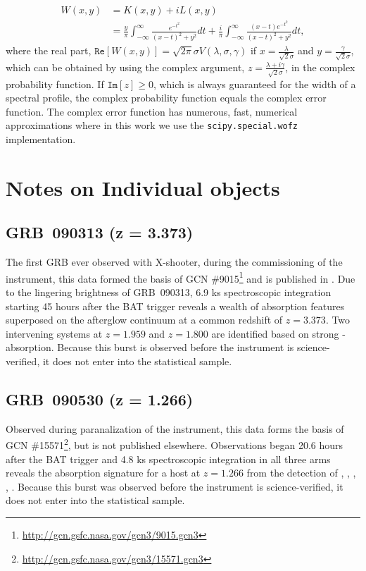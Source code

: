 \documentclass{aa}    %
\begin{document}
\begin{equation} 
\begin{split}
W(x, y)  
& = K(x, y) + i L(x, y) \\
& = \frac{y}{\pi}  \int_{-\infty}^{\infty} \frac{e^{- t^2 }}{(x -  t)^2 +y^2} dt  + \frac{i}{\pi}  \int_{-\infty}^{\infty} \frac{(x - t)e^{- t^2 }}{(x -  t)^2 +y^2} dt,
\end{split}
\end{equation}
where the real part, $\mathtt{Re}[W(x, y)] =  \sqrt{2 \pi} \sigma
V(\lambda,\sigma, \gamma)$ if $x = \frac{\lambda}{\sqrt{2} \sigma}$ and $y =
\frac{\gamma}{\sqrt{2} \sigma}$, which can be obtained by using the complex
argument, $z = \frac{\lambda + i\gamma}{\sqrt{2} \sigma}$, in the complex
probability function. If $\mathtt{Im}[z] \geq 0$, which is always guaranteed for
the width of a spectral profile, the complex probability function equals the
complex error function. The complex error function has numerous, fast, numerical
approximations where in this work we use the \texttt{scipy.special.wofz}
\citep{scipy} implementation.


\section{Notes on Individual objects} \label{notes}

\subsection{GRB~090313 (z = 3.373)}
The first GRB ever observed with X-shooter, during the commissioning of the
instrument, this data formed the basis of GCN
\#9015\footnote{\url{http://gcn.gsfc.nasa.gov/gcn3/9015.gcn3}} and is published
in \citet{DeUgartePostigo2010}. Due to the lingering brightness of GRB~090313,
6.9 ks spectroscopic integration starting 45 hours after the BAT trigger reveals
a wealth of absorption features superposed on the afterglow continuum at a
common redshift of $z = 3.373$. Two intervening systems at $z = 1.959$ and $z =
1.800$ are identified based on strong \mgii-absorption. Because this burst is
observed before the instrument is science-verified, it does not enter into the
statistical sample.

\subsection{GRB~090530 (z = 1.266)}
Observed during paranalization of the instrument, this data forms the basis of
GCN \#15571\footnote{\url{http://gcn.gsfc.nasa.gov/gcn3/15571.gcn3}}, but is not
published elsewhere. Observations began 20.6 hours after the BAT trigger and 4.8
ks spectroscopic integration in all three arms reveals the absorption signature
for a host at $z = 1.266$ from the detection of \mgii, \mgi, \SIii, \feii,
\aliii. Because this burst was observed before the instrument is
science-verified, it does not enter into the statistical sample.
\end{document}
